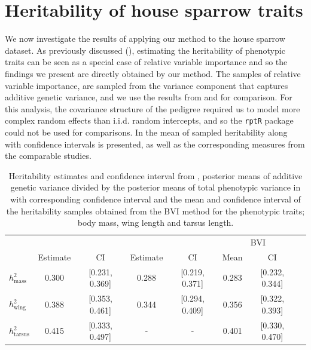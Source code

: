 \section{Heritability of house sparrow traits}
We now investigate the results of applying our method to the house sparrow dataset. As previously discussed (), estimating the heritability of phenotypic traits can be seen as a special case of relative variable importance and so the findings we present are directly obtained by our method. The samples of relative variable importance, are sampled from the variance component that captures additive genetic variance, and we use the results from \citet{Silva2017} and \citet{Muff2019Genetic} for comparison. For this analysis, the covariance structure of the pedigree required us to model more complex random effects than i.i.d. random intercepts, and so the \texttt{rptR} package could not be used for comparisons. In  the mean of sampled heritability along with confidence intervals is presented, as well as the corresponding measures from the comparable studies.
\begin{table}[H]
  \centering
  \begin{tabular}{lccccccc}
  \toprule
   & \multicolumn{2}{c}{\citet{Silva2017}} & \multicolumn{2}{c}{\citet{Muff2019Genetic}} & \multicolumn{2}{c}{BVI} \\ 
   \cmidrule(lr){2-3} \cmidrule(lr){4-5} \cmidrule(lr){6-7}
   & Estimate & CI & Estimate & CI & Mean & CI \\ 
  \midrule
  $h^2_{\text{mass}}$    & 0.300 & [0.231, 0.369] & 0.288 & [0.219, 0.371] & 0.283 & [0.232, 0.344] \\
  $h^2_{\text{wing}}$    & 0.388 & [0.353, 0.461] & 0.344 & [0.294, 0.409] & 0.356 & [0.322, 0.393] \\
  $h^2_{\text{tarsus}}$  & 0.415 & [0.333, 0.497] & - & - & 0.401 & [0.330, 0.470] \\ 
  \bottomrule
  \end{tabular}
  \caption[Heritability estimates and confidence intervals]{Heritability estimates and confidence interval from \citet{Silva2017}, posterior means of additive genetic variance divided by the posterior means of total phenotypic variance in \citet{Muff2019Genetic} with corresponding confidence interval and the mean and confidence interval of the heritability samples obtained from the BVI method for the phenotypic traits; body mass, wing length and tarsus length.}
  \label{table:summary_heritability}
\end{table}
